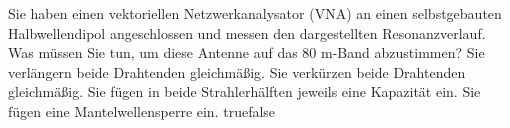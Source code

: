    {Sie haben einen vektoriellen Netzwerkanalysator (VNA) an einen selbstgebauten Halbwellendipol angeschlossen und messen den dargestellten Resonanzverlauf. Was müssen Sie tun, um diese Antenne auf das 80 m-Band abzustimmen? }
    {Sie verlängern beide Drahtenden gleichmäßig.}
    {Sie verkürzen beide Drahtenden gleichmäßig.}
    {Sie fügen in beide Strahlerhälften jeweils eine Kapazität ein.}
    {Sie fügen eine Mantelwellensperre ein.}
    {true}{false}